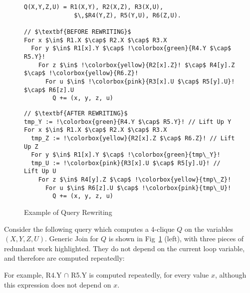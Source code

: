 \begin{figure}[t]
  
{
  \begin{minipage}{0.495\textwidth}
\begin{lstlisting}[style=BashInputStyle,
  label=lst:beforeopt]
Q(X,Y,Z,U) = R1(X,Y), R2(X,Z), R3(X,U),
              $\,$R4(Y,Z), R5(Y,U), R6(Z,U).

// $\textbf{BEFORE REWRITING}$
For x $\in$ R1.X $\cap$ R2.X $\cap$ R3.X
  For y $\in$ R1[x].Y $\cap$ !\colorbox{green}{R4.Y $\cap$ R5.Y}!
    For z $\in$ !\colorbox{yellow}{R2[x].Z}! $\cap$ R4[y].Z $\cap$ !\colorbox{yellow}{R6.Z}!
      For u $\in$ !\colorbox{pink}{R3[x].U $\cap$ R5[y].U}! $\cap$ R6[z].U
        Q += (x, y, z, u)
\end{lstlisting}
  \end{minipage}
  
  \begin{minipage}{0.495\textwidth}
\begin{lstlisting}[style=BashInputStyle,
  label=lst:afteropt]  
// $\textbf{AFTER REWRITING}$ 
tmp_Y := !\colorbox{green}{R4.Y $\cap$ R5.Y}! // Lift Up Y
For x $\in$ R1.X $\cap$ R2.X $\cap$ R3.X
  tmp_Z := !\colorbox{yellow}{R2[x].Z $\cap$ R6.Z}! // Lift Up Z
  For y $\in$ R1[x].Y $\cap$ !\colorbox{green}{tmp\_Y}!
  tmp_U := !\colorbox{pink}{R3[x].U $\cap$ R5[y].U}! // Lift Up U
    For z $\in$ R4[y].Z $\cap$ !\colorbox{yellow}{tmp\_Z}!
      For u $\in$ R6[z].U $\cap$ !\colorbox{pink}{tmp\_U}!
        Q += (x, y, z, u)
\end{lstlisting}
  \end{minipage}
}
\caption{Example of Query Rewriting}
\label{fig:rewrtie}
\end{figure}

\begin{example} \label{ex:duplicate:intersections}
Consider the following query which computes a 4-clique $Q$ on the variables $(X,Y,Z,U)$. Generic Join for $Q$ is shown in Fig~\ref{fig:rewrtie} (left), with three pieces of redundant
work highlighted. They do not depend on the current loop variable, and
therefore are computed repeatedly:


For example, R4.Y $\cap$ R5.Y is computed repeatedly, for every value
$x$, although this expression does not depend on $x$.

\end{example}

